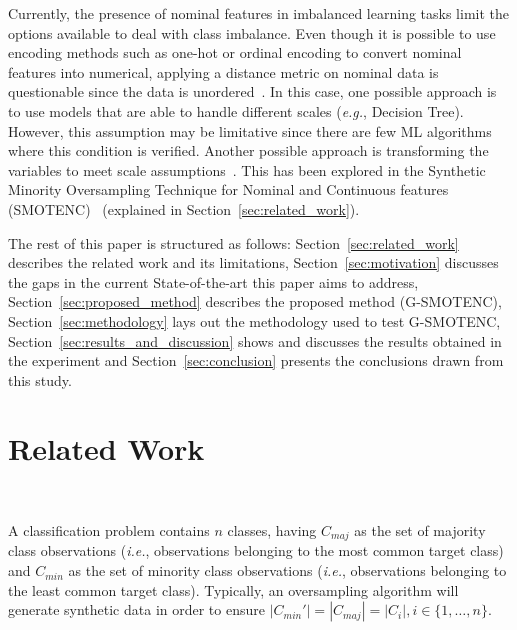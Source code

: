 \documentclass[parskip=full]{scrartcl}
\begin{document}
Currently, the presence of nominal features in imbalanced learning tasks limit
the options available to deal with class imbalance. Even though it is possible
to use encoding methods such as one-hot or ordinal encoding to convert nominal
features into numerical, applying a distance metric on nominal data is
questionable since the data is unordered~\cite{lumijarvi2004comparison}. In
this case, one possible approach is to use models that are able to handle
different scales (\textit{e.g.}, Decision Tree). However, this assumption may
be limitative since there are few ML algorithms where this condition is
verified. Another possible approach is transforming the variables to meet
scale assumptions~\cite{lumijarvi2004comparison}. This has been
explored in the Synthetic Minority Oversampling Technique for Nominal and
Continuous features (SMOTENC)~\cite{Chawla2002} (explained in
Section~\ref{sec:related_work}).




The rest of this paper is structured as follows:
Section~\ref{sec:related_work} describes the related work and its limitations,
Section~\ref{sec:motivation} discusses the gaps in the current
State-of-the-art this paper aims to address, Section~\ref{sec:proposed_method}
describes the proposed method (G-SMOTENC), Section~\ref{sec:methodology} lays
out the methodology used to test G-SMOTENC,
Section~\ref{sec:results_and_discussion} shows and discusses the results
obtained in the experiment and Section~\ref{sec:conclusion} presents the
conclusions drawn from this study.


\section{Related Work}~\label{sec:related_work}

A classification problem contains $n$ classes, having $C_{maj}$ as the set of
majority class observations (\textit{i.e.}, observations belonging to the most
common target class) and $C_{min}$ as the set of minority class observations
(\textit{i.e.}, observations belonging to the least common target class).
Typically, an oversampling algorithm will generate synthetic data in order to
ensure $|C_{min}'|=|C_{maj}|=|C_i|, i \in \{1, \ldots, n\}$.
\end{document}

